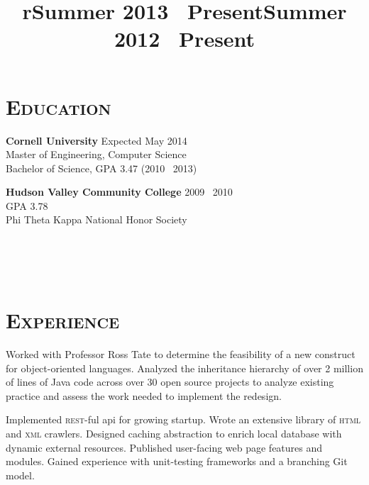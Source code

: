 \begin{resume}

\vspace{0.5cm}

\section{\textsc{Education}}

\textbf{Cornell University} \hfill Expected May 2014 \\
Master of Engineering, Computer Science\\
Bachelor of Science, GPA 3.47 (2010 \textendash\ 2013)

\textbf{Hudson Valley Community College} \hfill 2009 \textendash\ 2010 \\ 
GPA 3.78\\
Phi Theta Kappa National Honor Society\\


\begin{formatb}
  \title{r}\\
  \\
  \body\\
\end{formatb}

\vspace{0.70cm}

\section{\textsc{Experience}}

\title{Summer 2013 \textendash \ Present}
\location{}
\begin{position}
Worked with Professor Ross Tate to determine the feasibility of a new construct for object-oriented languages.
Analyzed the inheritance hierarchy of over 2 million of lines of Java code across over 30 open source projects to analyze existing practice and assess the work needed to implement the redesign.
\end{position}

\title{Summer 2012 \textendash\ Present}
\location{}
\begin{position}
Implemented \textsc{rest-}ful api for growing startup.
Wrote an extensive library of \textsc{html} and \textsc{xml} crawlers.
Designed caching abstraction to enrich local database with dynamic external resources.
Published user-facing web page features and modules.
Gained experience with unit-testing frameworks and a branching Git model.
\end{position}


\end{resume}
